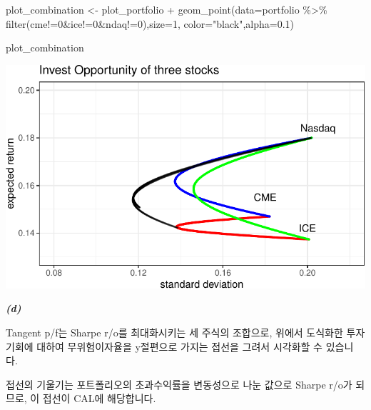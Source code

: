 \documentclass[
  letterpaper,
  DIV=11,
  numbers=noendperiod]{scrreprt}
\newenvironment{Shaded}{\begin{snugshade}}{\end{snugshade}}
\newcommand{\AttributeTok}[1]{\textcolor[rgb]{0.40,0.45,0.13}{#1}}
\newcommand{\DecValTok}[1]{\textcolor[rgb]{0.68,0.00,0.00}{#1}}
\newcommand{\FloatTok}[1]{\textcolor[rgb]{0.68,0.00,0.00}{#1}}
\newcommand{\FunctionTok}[1]{\textcolor[rgb]{0.28,0.35,0.67}{#1}}
\newcommand{\NormalTok}[1]{\textcolor[rgb]{0.00,0.23,0.31}{#1}}
\newcommand{\OtherTok}[1]{\textcolor[rgb]{0.00,0.23,0.31}{#1}}
\newcommand{\SpecialCharTok}[1]{\textcolor[rgb]{0.37,0.37,0.37}{#1}}
\newcommand{\StringTok}[1]{\textcolor[rgb]{0.13,0.47,0.30}{#1}}
\begin{document}
\begin{Shaded}
\begin{Highlighting}[]
\NormalTok{plot\_combination }\OtherTok{\textless{}{-}}\NormalTok{ plot\_portfolio }\SpecialCharTok{+}
  \FunctionTok{geom\_point}\NormalTok{(}\AttributeTok{data=}\NormalTok{portfolio }\SpecialCharTok{\%\textgreater{}\%} \FunctionTok{filter}\NormalTok{(cme}\SpecialCharTok{!=}\DecValTok{0}\SpecialCharTok{\&}\NormalTok{ice}\SpecialCharTok{!=}\DecValTok{0}\SpecialCharTok{\&}\NormalTok{ndaq}\SpecialCharTok{!=}\DecValTok{0}\NormalTok{),}\AttributeTok{size=}\DecValTok{1}\NormalTok{,}
  \AttributeTok{color=}\StringTok{"black"}\NormalTok{,}\AttributeTok{alpha=}\FloatTok{0.1}\NormalTok{)}

\NormalTok{plot\_combination}
\end{Highlighting}
\end{Shaded}

\includegraphics{investment_hw2_files/figure-pdf/unnamed-chunk-6-1.pdf}

\textbf{\emph{(d)}}

Tangent p/f는 Sharpe r/o를 최대화시키는 세 주식의 조합으로, 위에서
도식화한 투자기회에 대하여 무위험이자율을 y절편으로 가지는 접선을 그려서
시각화할 수 있습니다.

접선의 기울기는 포트폴리오의 초과수익률을 변동성으로 나눈 값으로 Sharpe
r/o가 되므로, 이 접선이 CAL에 해당합니다.
\end{document}
